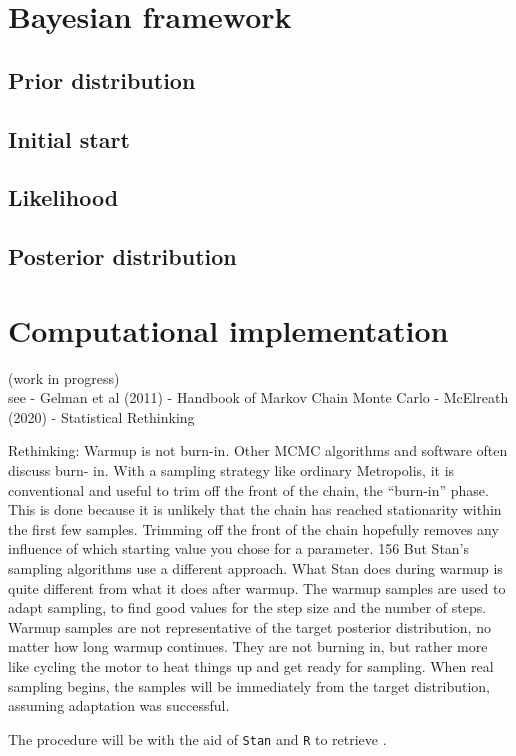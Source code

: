 \section{Bayesian framework}

\subsection{Prior distribution}

\subsection{Initial start}

\subsection{Likelihood}

\subsection{Posterior distribution}


\section{Computational implementation} \label{sect:comp_imp}

{\color{red} (work in progress) \\
see 
- Gelman et al (2011) - Handbook of Markov Chain Monte Carlo
- McElreath (2020) - Statistical Rethinking

Rethinking: Warmup is not burn-in. Other MCMC algorithms and software often discuss burn-
in. With a sampling strategy like ordinary Metropolis, it is conventional and useful to trim off the
front of the chain, the “burn-in” phase. This is done because it is unlikely that the chain has reached
stationarity within the first few samples. Trimming off the front of the chain hopefully removes any
influence of which starting value you chose for a parameter. 156
But Stan’s sampling algorithms use a different approach. What Stan does during warmup is quite
different from what it does after warmup. The warmup samples are used to adapt sampling, to find
good values for the step size and the number of steps. Warmup samples are not representative of
the target posterior distribution, no matter how long warmup continues. They are not burning in,
but rather more like cycling the motor to heat things up and get ready for sampling. When real
sampling begins, the samples will be immediately from the target distribution, assuming adaptation
was successful.

}


The procedure will be with the aid of \texttt{Stan} \cite{Stan2020} and \texttt{R} \cite{R2015, RStan2020} to retrieve . \\




